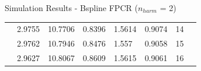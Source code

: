 \documentclass{beamer}
\begin{document}
\begin{frame}{Simulation Results - Bspline FPCR ($n_{harm}$ = 2)}
\begin{table}
{\begin{tabular}{llllllll}
					& 2.9755                       & 10.7706                       & 0.8396                        & 1.5614                        & 0.9074           & 14               &  \\
					& 2.9762                       & 10.7946                       & 0.8476                        & 1.557                         & 0.9058           & 15               &  \\
					& 2.9627                       & 10.8067                       & 0.8609                        & 1.5615                        & 0.9061           & 16          
				\end{tabular}%
			}
		\end{table}
		\hyperlink{Results}{}
	\end{frame}
	
	
	
\end{document}
